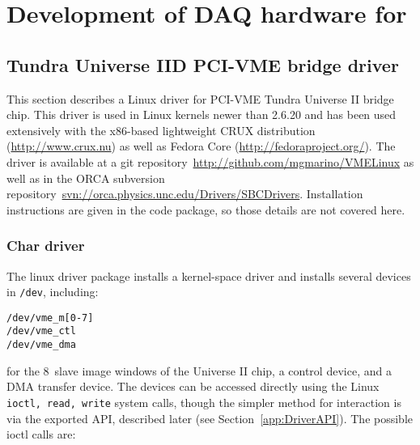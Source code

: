 
\chapter{Development of DAQ hardware for \MJ}
\label{app:ORCASoftwareChapter}

	\section{Tundra Universe IID PCI-VME bridge driver}
	\label{sec:TundraUniverse}

This section describes a Linux driver for PCI-VME Tundra Universe II bridge chip.  This
driver is used in Linux kernels newer than 2.6.20 and has been used extensively
with the x86-based lightweight CRUX distribution (\url{http://www.crux.nu}) as
well as Fedora Core (\url{http://fedoraproject.org/}).  The driver is available
at a git repository~\url{http://github.com/mgmarino/VMELinux} as well as in the ORCA subversion
repository~\url{svn://orca.physics.unc.edu/Drivers/SBCDrivers}.  Installation instructions
are given in the code package, so those details are not covered here.

		\subsection{Char driver}

The linux driver package installs a kernel-space driver and installs several devices in 
\lstinline!/dev!, including:
		\begin{lstlisting}
/dev/vme_m[0-7]
/dev/vme_ctl
/dev/vme_dma
		\end{lstlisting}
for the 8~slave image windows of the Universe II chip, a control device, and a DMA transfer device.  The devices can be accessed directly using the Linux \lstinline!ioctl, read, write! 
system calls, though the simpler method for interaction is via the exported API, described later (see Section~\ref{app:DriverAPI}).  The possible ioctl calls are:


